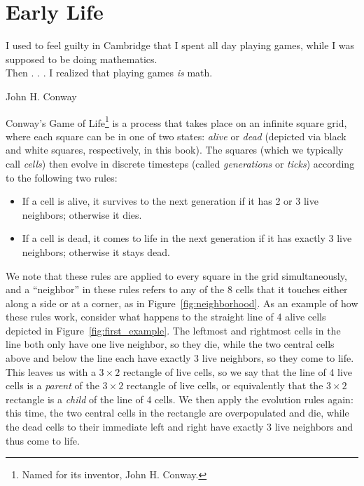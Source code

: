 
\renewcommand{\chapterfolder}{early_life/}
\chapter{Early Life}


\vspace*{-0.4in}
\epigraph{I used to feel guilty in Cambridge that I spent all day playing games, while I was supposed to be doing mathematics. \\ Then . . . I realized that playing games \emph{is} math.}{John H. Conway}
\vspace*{0.4in}


\noindent Conway's Game of Life\footnote{Named for its inventor, John H. Conway.} is a process that takes place on an infinite square grid, where each square can be in one of two states: \emph{alive} or \emph{dead} (depicted via black and white squares, respectively, in this book). The squares (which we typically call \emph{cells}) then evolve in discrete timesteps (called \emph{generations} or \emph{ticks}) according to the following two rules:\smallskip

\begin{itemize}
	\item If a cell is alive, it survives to the next generation if it has 2 or 3 live neighbors; otherwise it dies.\smallskip
	
	\item If a cell is dead, it comes to life in the next generation if it has exactly 3 live neighbors; otherwise it stays dead.\smallskip
\end{itemize}

We note that these rules are applied to every square in the grid simultaneously, and a ``neighbor'' in these rules refers to any of the 8 cells that it touches either along a side or at a corner, as in Figure~\ref{fig:neighborhood}. As an example of how these rules work, consider what happens to the straight line of 4 alive cells depicted in Figure~\ref{fig:first_example}. The leftmost and rightmost cells in the line both only have one live neighbor, so they die, while the two central cells above and below the line each have exactly 3 live neighbors, so they come to life. This leaves us with a $3 \times 2$ rectangle of live cells, so we say that the line of 4 live cells is a \emph{parent} of the $3 \times 2$ rectangle of live cells, or equivalently that the $3 \times 2$ rectangle is a \emph{child} of the line of 4 cells. We then apply the evolution rules again: this time, the two central cells in the rectangle are overpopulated and die, while the dead cells to their immediate left and right have exactly 3 live neighbors and thus come to life.

